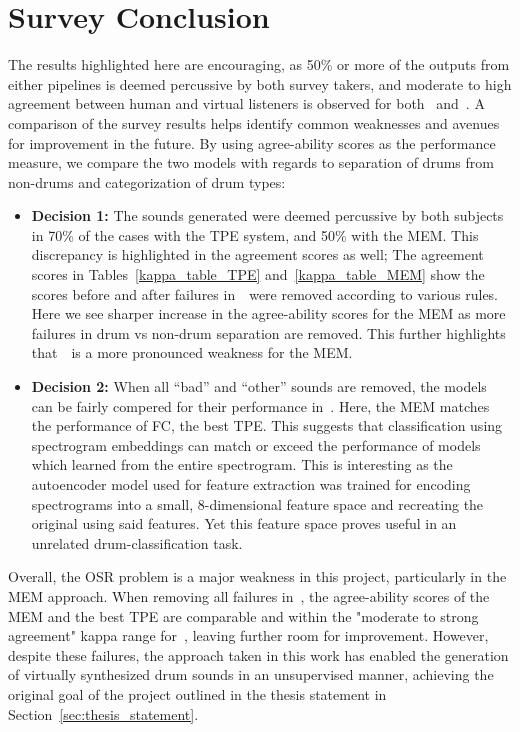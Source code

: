 \documentclass[\main/thesis.tex]{subfiles}
\begin{document}
\section{Survey Conclusion}
The results highlighted here are encouraging, as 50\% or more of the outputs from either pipelines is deemed percussive by both survey takers, and moderate to high agreement between human and virtual listeners is observed for both \decfirst~and~\decsecond. A comparison of the survey results helps identify common weaknesses and avenues for improvement in the future. By using agree-ability scores as the performance measure, we compare the two models with regards to separation of drums from non-drums and categorization of drum types:
\begin{itemize}
\item \textbf{Decision 1:} The sounds generated were deemed percussive by both subjects in 70\% of the cases with the TPE system, and 50\% with the MEM. This discrepancy is highlighted  in the agreement scores as well; The agreement scores in Tables~\ref{kappa_table_TPE} and~\ref{kappa_table_MEM} show the scores before and after failures in~\decfirst~were removed according to various rules. Here we see sharper increase in the agree-ability scores for the MEM as more failures in drum vs non-drum separation are removed. This further highlights that~\decfirst~is a more pronounced weakness for the MEM.
\item \textbf{Decision 2:} When all \enquote{bad} and \enquote{other} sounds are removed, the models can be fairly compered for their performance in~\decsecond. Here, the MEM matches the performance of FC, the best TPE. This suggests that classification using spectrogram embeddings can match or exceed the performance of models which learned from the entire spectrogram. This is interesting as the autoencoder model used for feature extraction was trained for encoding spectrograms into a small, 8-dimensional feature space and recreating the original using said features. Yet this feature space proves useful in an unrelated drum-classification task.  
\end{itemize}

Overall, the OSR problem is a major weakness in this project, particularly in the MEM approach. When removing all failures in~\decfirst, the agree-ability scores of the MEM and the best TPE are comparable and within the "moderate to strong agreement" kappa range for~\decsecond, leaving further room for improvement. However, despite these failures, the approach taken in this work has enabled the generation of virtually synthesized drum sounds in an unsupervised manner, achieving the original goal of the project outlined in the thesis statement in Section~\ref{sec:thesis_statement}. 
\end{document}
